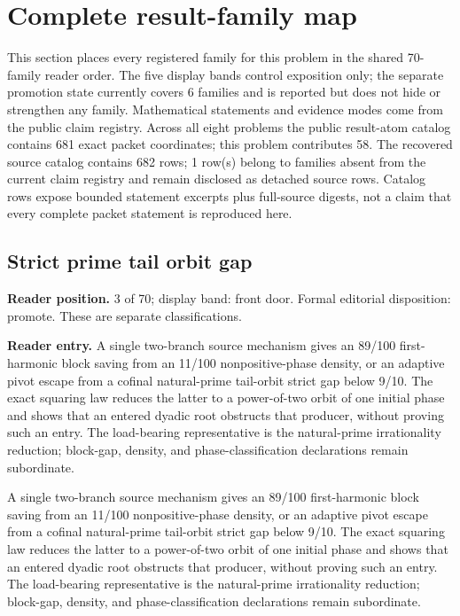 \clearpage
\section{Complete result-family map}\label{sec:erdos-249-complete-family-map}

This section places every registered family for this problem in the shared 70-family reader order.  The five display bands control exposition only; the separate promotion state currently covers 6 families and is reported but does not hide or strengthen any family.  Mathematical statements and evidence modes come from the public claim registry.  Across all eight problems the public result-atom catalog contains 681 exact packet coordinates; this problem contributes 58.  The recovered source catalog contains 682 rows; 1 row(s) belong to families absent from the current claim registry and remain disclosed as detached source rows.  Catalog rows expose bounded statement excerpts plus full-source digests, not a claim that every complete packet statement is reproduced here.

\subsection{Strict prime tail orbit gap}
\textbf{Reader position.} 3 of 70; display band: front door.  Formal editorial disposition: promote.  These are separate classifications.

\textbf{Reader entry.} A single two-branch source mechanism gives an 89/100 first-harmonic block saving from an 11/100 nonpositive-phase density, or an adaptive pivot escape from a cofinal natural-prime tail-orbit strict gap below 9/10. The exact squaring law reduces the latter to a power-of-two orbit of one initial phase and shows that an entered dyadic root obstructs that producer, without proving such an entry. The load-bearing representative is the natural-prime irrationality reduction; block-gap, density, and phase-classification declarations remain subordinate.

A single two-branch source mechanism gives an 89/100 first-harmonic block saving from an 11/100 nonpositive-phase density, or an adaptive pivot escape from a cofinal natural-prime tail-orbit strict gap below 9/10. The exact squaring law reduces the latter to a power-of-two orbit of one initial phase and shows that an entered dyadic root obstructs that producer, without proving such an entry. The load-bearing representative is the natural-prime irrationality reduction; block-gap, density, and phase-classification declarations remain subordinate.

